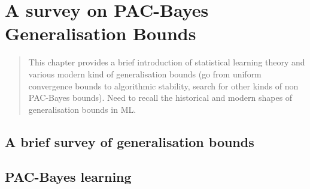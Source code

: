 \chapter[A survey on PAC-Bayes Generalisation Bounds]{A survey on PAC-Bayes Generalisation Bounds}
\label{chap:intro-stat-learning}

\minitoc

\addchapterlof
\addchapterloa
\addchapterloe

\begin{abstract}
    This chapter provides a brief introduction of statistical learning theory and various modern kind of generalisation bounds (go from uniform convergence bounds to algorithmic stability, search for other kinds of non PAC-Bayes bounds). Need to recall the historical and modern shapes of generalisation bounds in ML. 
   
\end{abstract}

\newpage

\section{A brief survey of generalisation bounds}

\section{PAC-Bayes learning}